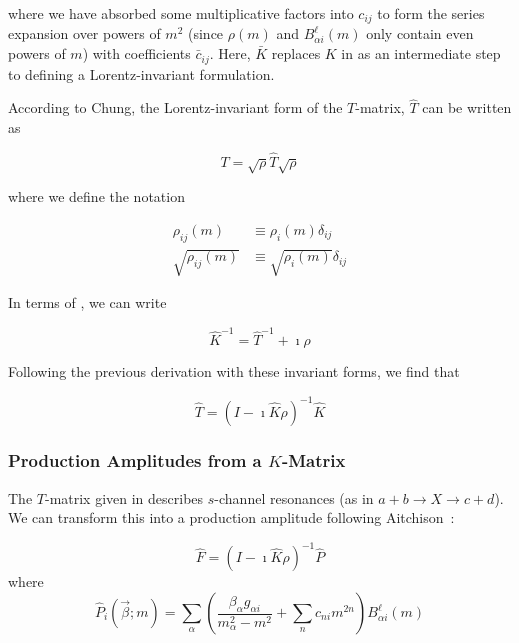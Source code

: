 where we have absorbed some multiplicative factors into $c_{ij}$ to form the series expansion over powers of $m^2$ (since $\rho(m)$ and $B^\ell_{\alpha i}(m)$ only contain even powers of $m$) with coefficients $\bar{c}_{ij}$. Here, $\bar{K}$ replaces $K$ in  as an intermediate step to defining a Lorentz-invariant formulation.

According to Chung\cite{chung_spin_1971}, the Lorentz-invariant form of the $T$-matrix, $\hat{T}$ can be written as

\begin{equation}
  T = \sqrt{\rho}\hat{T}\sqrt{\rho}
\end{equation}

where we define the notation

\begin{align}
  \rho_{ij}(m) &\equiv \rho_i(m)\delta_{ij}\\
  \sqrt{\rho_{ij}(m)} &\equiv \sqrt{\rho_i(m)}\delta_{ij}
\end{align}

In terms of , we can write

\begin{equation}
  \hat{K}^{-1} = \hat{T}^{-1} + \imath \rho
\end{equation}

Following the previous derivation with these invariant forms, we find that

\begin{equation}
  \hat{T} = (I - \imath\hat{K}\rho)^{-1}\hat{K}
  \label{eq:t-matrix-from-k-matrix-invariant}
\end{equation}


\subsubsection{Production Amplitudes from a $K$-Matrix}

The $T$-matrix given in  describes $s$-channel resonances (as in $a + b \to X \to c + d$). We can transform this into a production amplitude following Aitchison~\cite{aitchison_k-matrix_1972}:

\begin{equation}
  \hat{F} = (I - \imath\hat{K}\rho)^{-1}\hat{P}
  \label{eq:k-matrix-production-amplitude}
\end{equation}
where
\begin{equation}
  \hat{P}_i(\vec{\beta}; m) = \sum_\alpha \left(\frac{\beta_\alpha g_{\alpha i}}{m_\alpha^2 - m^2} + \sum_n c_{ni} m^{2n} \right)B_{\alpha i}^{\ell}(m)
  \label{eq:p-vector}
\end{equation}

